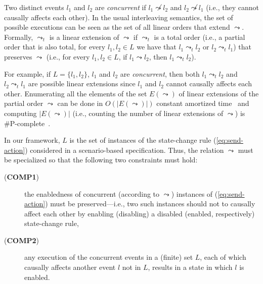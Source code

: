 \documentclass[conference]{llncs}
\begin{document}
{Two distinct events
$l_1$ and $l_2$ are \emph{concurrent} if $l_1\not\leadsto l_2$ and
$l_2\not\leadsto l_1$ (i.e., they cannot causally affects each other). 
In the usual interleaving semantics, the set of possible executions can be seen as the set of all
linear orders that extend $\leadsto$. Formally, $\leadsto_t$ is a linear
extension of $\leadsto$ if $\leadsto_t$ is a total order 
(i.e., a partial order that is also total, for every $l_1,l_2\in L$ we have that
$l_1\leadsto_t l_2$ or $l_2\leadsto_t l_1$) 
that preserves $\leadsto$ (i.e., for every $l_1,l_2\in L$, if $l_1\leadsto l_2$, then $l_1\leadsto_t l_2$). 

For example, if $L=\{l_1,l_2\}$, $l_1$ and $l_2$
are \emph{concurrent}, then both $l_1\leadsto_t l_2$ and $l_2\leadsto_t
l_1$ are possible linear extensions since $l_1$ and $l_2$ cannot
causally affects each other. Enumerating all the elements of the set
$E(\leadsto)$ of linear extensions of the partial order $\leadsto$ can
be done in $O(|E(\leadsto)|)$ constant amortized
time~\cite{pruesse-ruskey} and computing $|E(\leadsto)|$ (i.e., counting
the number of linear extensions of $\leadsto$) is
\#P-complete~\cite{brightwell-winkler}.  

In our framework, $L$ is the set of instances
of the state-change rule (\ref{eq:send-action}) considered in a
scenario-based specification. 
Thus, the relation $\leadsto$ must be specialized so that
the following two constraints must hold: 
\begin{description}
\item[(\textbf{COMP1})] the
enabledness of concurrent (according to $\leadsto$) instances of
(\ref{eq:send-action}) must be preserved---i.e., two such instances
should not to causally affect each other by enabling (disabling) a
disabled (enabled, respectively) state-change rule,
\item[(\textbf{COMP2})] any execution of the concurrent events in a (finite)
set $L$, each of which causally affects another event $l$ not in $L$,
results in a state in which $l$ is enabled.
\end{description}
 
}
\end{document}
